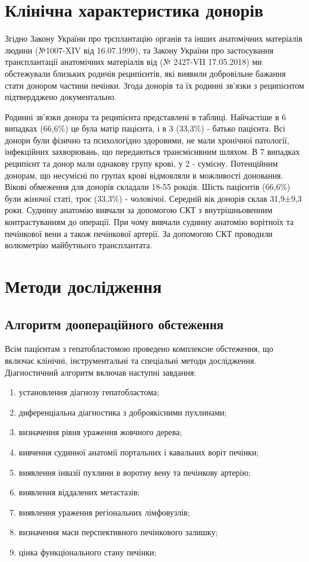 \section{Клінічна характеристика донорів}
Згідно Закону України про трсплантацію органів та інших анатомічних матеріалів людини (№1007-XIV від 16.07.1999), та Закону України про застосування трансплантації анатомічних матеріалів від (№ 2427-VII  17.05.2018) ми обстежували близьких родичів реципієнтів, які виявили добровільне бажання стати донором частини печінки. Згода донорів та їх родинні зв'язки з реципієнтом підтвердджено документально. 

Родинні зв'язки донора та реципієнта представлені в таблиці. Найчастіше в 6 випадках (66,6\%) це була матір пацієнта, і в 3 (33,3\%) - батько пацієнта. 
Всі донори були фізично та психологідно здоровими, не мали хронічної патології, інфекційних захворювань, що передаються трансмісивним шляхом. В 7 випадках реципієнт та донор мали однакову групу крові, у 2 - сумісну. Потенційним донорам, що несумісні по групах крові відмовляли в можливості доновання. Вікові обмеження для донорів складали 18-55 рокців. 
Шість пацієнтів (66,6\%) були жіночої статі, троє (33,3\%) - чоловічої. Середній вік донорів склав 31,9±9,3 роки. 
Судинну анатомію вивчали за допомогою СКТ з внутрішньовенним контрастуванням до операції. При чому вивчали судинну анатомію ворітноїх та печінкової вени а також печінкової артерії. 
За допомогою СКТ проводили волюметрію майбутнього трансплантата. 

\section{Методи дослідження}
\subsection{Алгоритм доопераційного обстеження}

Всім пацієнтам з гепатобластомою проведено комплексне обстеження, що включає клінічні, інструментальні та спеціальні методи дослідження.
Діагностичний алгоритм включав наступні завдання:
\begin{enumerate}
    \item установлення діагнозу гепатобластома;
    \item диференціальна діагностика з доброякісними пухлинами;
    \item визначення рівня ураження жовчного дерева;
    \item вивчення судинної анатомії портальних і кавальних воріт печінки;
    \item виявлення інвазії пухлини в воротну вену та печінкову артерію;
    \item виявлення віддалених метастазів;
    \item виявлення ураження регіональних лімфовузлів;
    \item визначення маси перспективного печінкового залишку;
    \item цінка функціонального стану печінки;
\end{enumerate}

